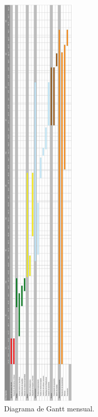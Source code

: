 \begin{figure}
    \centering
    \includegraphics[width=0.32\textwidth]{imagenes/capitulo3/0001.jpg}
    \caption{Diagrama de Gantt mensual.}
	\vspace{0.3cm}
    \label{fig:ganttMes}
\end{figure}


